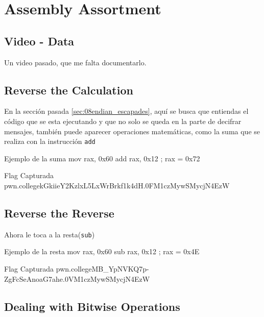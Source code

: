 \section{Assembly Assortment}\label{sec:assembly_assortment}

\sectiontoc

\subsection{Video - Data}\label{subsec:video_data}

Un video pasado, que me falta documentarlo.

\subsection{Reverse the Calculation}\label{subsec:reverse_the_calculation}

En la sección pasada \ref{sec:08endian_escapades}, aquí se busca que
entiendas el código que se esta ejecutando y que no solo se queda en la parte de decifrar mensajes,
también puede aparecer operaciones matemáticas, como la suma que se realiza con la instrucción
\texttt{add}

\begin{codebox}[ASM]{Ejemplo de la suma}
	mov rax, 0x60
	add rax, 0x12 ; rax = 0x72
\end{codebox}
\begin{flagbox}{Flag Capturada}
	pwn.college{kGkiieY2KzlxL5LxWrBrkf1k4dH.0FM1czMywSMycjN4EzW}
\end{flagbox}


\subsection{Reverse the Reverse}\label{subsec:reverse_the_reverse}
Ahora le toca a la resta(\texttt{sub})
\begin{codebox}[ASM]{Ejemplo de la resta}
	mov rax, 0x60
	sub rax, 0x12 ; rax = 0x4E
\end{codebox}
\begin{flagbox}{Flag Capturada}
	pwn.college{MB_YpNVKQ7p-ZgFcSeAnoaG7ahe.0VM1czMywSMycjN4EzW}
\end{flagbox}
\subsection{Dealing with Bitwise Operations}\label{subsec:dealing_with_bitwise_operations}

